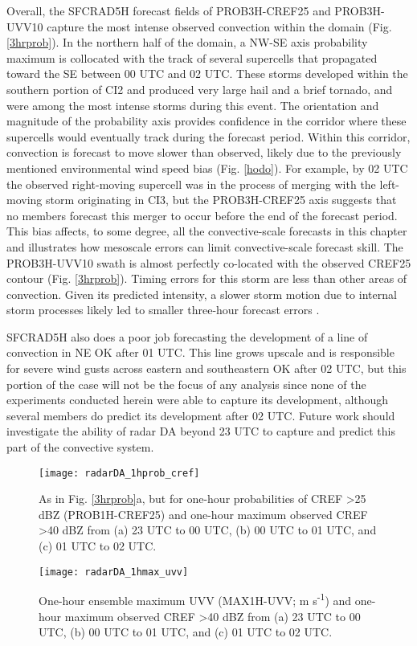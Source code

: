 Overall, the SFCRAD5H forecast fields of PROB3H-CREF25 and PROB3H-UVV10 capture the most intense observed convection within the domain (Fig. \ref{3hrprob}). In the northern half of the domain, a NW-SE axis probability maximum is collocated with the track of several supercells that propagated toward the SE between 00 UTC and 02 UTC. These storms developed within the southern portion of CI2 and produced very large hail and a brief tornado, and were among the most intense storms during this event. The orientation and magnitude of the probability axis provides confidence in the corridor where these supercells would eventually track during the forecast period. Within this corridor, convection is forecast to move slower than observed, likely due to the previously mentioned environmental wind speed bias (Fig. \ref{hodo}). For example, by 02 UTC the observed right-moving supercell was in the process of merging with the left-moving storm originating in CI3, but the PROB3H-CREF25 axis suggests that no members forecast this merger to occur before the end of the forecast period. This bias affects, to some degree, all the convective-scale forecasts in this chapter and illustrates how mesoscale errors can limit convective-scale forecast skill. The PROB3H-UVV10 swath is almost perfectly co-located with the observed CREF25 contour (Fig. \ref{3hrprob}). Timing errors for this storm are less than other areas of convection. Given its predicted intensity, a slower storm motion due to internal storm processes likely led to smaller three-hour forecast errors \citep{bunkersetal00}.

SFCRAD5H also does a poor job forecasting the development of a line of convection in NE OK after 01 UTC. This line grows upscale and is responsible for severe wind gusts across eastern and southeastern OK after 02 UTC, but this portion of the case will not be the focus of any analysis since none of the experiments conducted herein were able to capture its development, although several members do predict its development after 02 UTC. Future work should investigate the ability of radar DA beyond 23 UTC to capture and predict this part of the convective system.

\begin{figure}
\centering
\texttt{[image: radarDA\_1hprob\_cref]}
\caption{As in Fig. \ref{3hrprob}a, but for one-hour probabilities of CREF \textgreater 25 dBZ (PROB1H-CREF25) and one-hour maximum observed CREF \textgreater 40 dBZ from (a) 23 UTC to 00 UTC, (b) 00 UTC to 01 UTC, and (c) 01 UTC to 02 UTC.}
\label{1hprob_cref}
\end{figure}
\begin{figure}
\centering
\texttt{[image: radarDA\_1hmax\_uvv]}
\caption{One-hour ensemble maximum UVV (MAX1H-UVV; m s\textsuperscript{-1}) and one-hour maximum observed CREF \textgreater 40 dBZ from (a) 23 UTC to 00 UTC, (b) 00 UTC to 01 UTC, and (c) 01 UTC to 02 UTC.}
\label{1hmax_uvv}
\end{figure}

